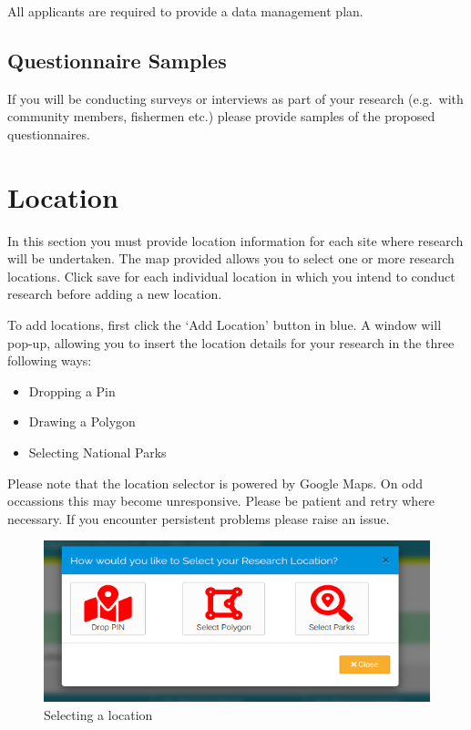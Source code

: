 \documentclass[
]{book}
\providecommand{\tightlist}{%
  \setlength{\itemsep}{0pt}\setlength{\parskip}{0pt}}
\begin{document}
All applicants are required to provide a data management plan.

\hypertarget{questionnaire-samples}{%
\section{Questionnaire Samples}\label{questionnaire-samples}}

If you will be conducting surveys or interviews as part of your research (e.g.~with community members, fishermen etc.) please provide samples of the proposed questionnaires.

\hypertarget{location}{%
\chapter{Location}\label{location}}

In this section you must provide location information for each site where research will be undertaken. The map provided allows you to select one or more research locations. Click save for each individual location in which you intend to conduct research before adding a new location.

To add locations, first click the `Add Location' button in blue. A window will pop-up, allowing you to insert the location details for your research in the three following ways:

\begin{itemize}
\tightlist
\item
  Dropping a Pin
\item
  Drawing a Polygon
\item
  Selecting National Parks
\end{itemize}

Please note that the location selector is powered by Google Maps. On odd occassions this may become unresponsive. Please be patient and retry where necessary. If you encounter persistent problems please raise an issue.

\begin{figure}
\centering
\includegraphics{images/Screenshot 2021-03-01 at 13.43.17.png}
\caption{Selecting a location}
\end{figure}
\end{document}
